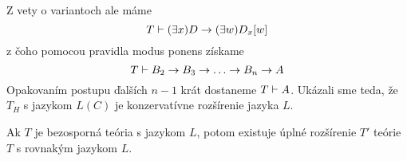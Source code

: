\begin{dokaz}
\begin{equation*}
    \end{equation*}
    Z vety o variantoch ale máme
    \begin{equation*}
        T \vdash ( \exists x ) D \rightarrow (\exists w) D_x[w] \\
    \end{equation*}
    z čoho pomocou pravidla modus ponens získame
    \begin{equation*}
        T \vdash B_2 \rightarrow B_3 \rightarrow \ldots \rightarrow B_n \rightarrow A
    \end{equation*}
    Opakovaním postupu ďalších $n-1$ krát dostaneme $T \vdash A$.
    Ukázali sme teda, že $T_H$ s jazykom $L(C)$ je konzervatívne rozšírenie jazyka $L$.
\end{dokaz}

\stopFIXME

\begin{veta}[Lindenbaum]
    Ak $T$ je bezosporná teória s jazykom $L$, potom existuje úplné
    rozšírenie $T'$ teórie $T$ s rovnakým jazykom $L$.
\end{veta}

